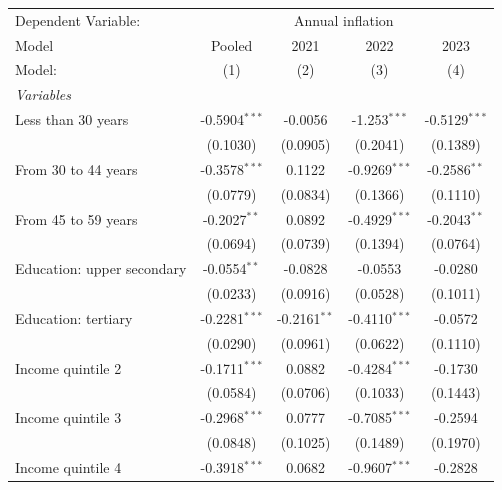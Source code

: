 
\begingroup
\centering
\begin{tabular}{lcccc}
   \tabularnewline \midrule \midrule
   Dependent Variable: & \multicolumn{4}{c}{Annual inflation}\\
   Model                      & Pooled          & 2021            & 2022            & 2023 \\   
   Model:                     & (1)             & (2)             & (3)             & (4)\\  
   \midrule
   \emph{Variables}\\
   Less than 30 years         & -0.5904$^{***}$ & -0.0056         & -1.253$^{***}$  & -0.5129$^{***}$\\   
                              & (0.1030)        & (0.0905)        & (0.2041)        & (0.1389)\\   
   From 30 to 44 years        & -0.3578$^{***}$ & 0.1122          & -0.9269$^{***}$ & -0.2586$^{**}$\\   
                              & (0.0779)        & (0.0834)        & (0.1366)        & (0.1110)\\   
   From 45 to 59 years        & -0.2027$^{**}$  & 0.0892          & -0.4929$^{***}$ & -0.2043$^{**}$\\   
                              & (0.0694)        & (0.0739)        & (0.1394)        & (0.0764)\\   
   Education: upper secondary & -0.0554$^{**}$  & -0.0828         & -0.0553         & -0.0280\\   
                              & (0.0233)        & (0.0916)        & (0.0528)        & (0.1011)\\   
   Education: tertiary        & -0.2281$^{***}$ & -0.2161$^{**}$  & -0.4110$^{***}$ & -0.0572\\   
                              & (0.0290)        & (0.0961)        & (0.0622)        & (0.1110)\\   
   Income quintile 2          & -0.1711$^{***}$ & 0.0882          & -0.4284$^{***}$ & -0.1730\\   
                              & (0.0584)        & (0.0706)        & (0.1033)        & (0.1443)\\   
   Income quintile 3          & -0.2968$^{***}$ & 0.0777          & -0.7085$^{***}$ & -0.2594\\   
                              & (0.0848)        & (0.1025)        & (0.1489)        & (0.1970)\\   
   Income quintile 4          & -0.3918$^{***}$ & 0.0682          & -0.9607$^{***}$ & -0.2828\\   

\end{tabular}
